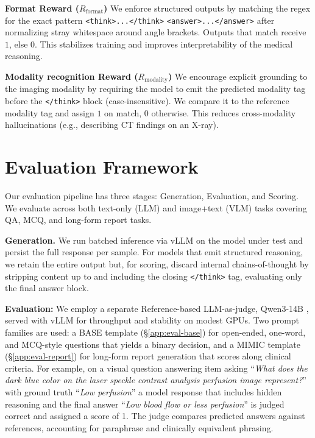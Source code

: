 \documentclass{article}
\theoremstyle{plain}
\theoremstyle{definition}
\theoremstyle{remark}
\begin{document}
\noindent\textbf{Format Reward ($R_{\text{format}}$)}
We enforce structured outputs by matching the regex for the exact pattern
{\footnotesize\texttt{<think>...</think>}} {\footnotesize\texttt{<answer>...</answer>}}
after normalizing stray whitespace around angle brackets. Outputs that match receive $1$, else $0$. This stabilizes training and improves interpretability of the medical reasoning.

\noindent\textbf{Modality recognition Reward ($R_{\text{modality}}$)}
We encourage explicit grounding to the imaging modality by requiring the model to emit the predicted modality tag before the {\small\texttt{</think>}} block (case-insensitive). We compare it to the reference modality tag and assign $1$ on match, $0$ otherwise. This reduces cross-modality hallucinations (e.g., describing CT findings on an X-ray).


\section{Evaluation Framework}

Our evaluation pipeline has three stages: Generation, Evaluation, and Scoring. We evaluate across both text-only (LLM) and image+text (VLM) tasks covering QA, MCQ, and long-form report tasks.

\textbf{Generation.} We run batched inference via vLLM on the model under test and persist the full response per sample. For models that emit structured reasoning, we retain the entire output but, for scoring, discard internal chains-of-thought by stripping content up to and including the closing {\small\texttt{</think>}} tag, evaluating only the final answer block.

\textbf{Evaluation:} We employ a separate Reference-based LLM-as-judge, Qwen3-14B \citep{qwen3technicalreport}, served with vLLM for throughput and stability on modest GPUs. Two prompt families are used: a BASE template (\S\ref{app:eval-base}) for open-ended, one-word, and MCQ-style questions that yields a binary decision, and a MIMIC template (\S\ref{app:eval-report}) for long-form report generation that scores along clinical criteria. For example, on a visual question answering item asking “\textit{What does the dark blue color on the laser speckle contrast analysis perfusion image represent?}” with ground truth “\textit{Low perfusion}” a model response that includes hidden reasoning and the final answer “\textit{Low blood flow or less perfusion}” is judged correct and assigned a score of 1. The judge compares predicted answers against references, accounting for paraphrase and clinically equivalent phrasing. 
\end{document}
